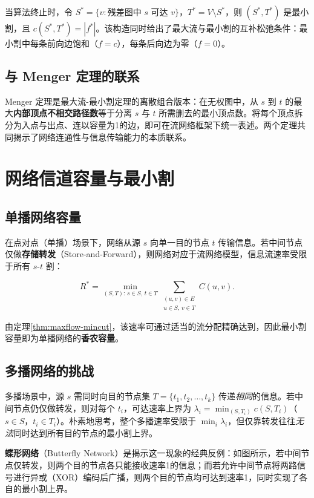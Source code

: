 \documentclass[12pt, a4paper]{article}
\begin{document}
当算法终止时，令 $S^* = \{v : \text{残差图中 }s\text{ 可达 }v\}$，$T^* = V\setminus S^*$，则 $(S^*,T^*)$ 是最小割，且 $c(S^*,T^*) = |f^*|$\cite{ford1956maximal}。该构造同时给出了最大流与最小割的互补松弛条件：最小割中每条前向边饱和（$f=c$），每条后向边为零（$f=0$）。

\subsection{与 Menger 定理的联系}

Menger 定理\cite{menger1927}是最大流-最小割定理的离散组合版本：在无权图中，从 $s$ 到 $t$ 的最大\textbf{内部顶点不相交路径数}等于分离 $s$ 与 $t$ 所需删去的最小顶点数。将每个顶点拆分为入点与出点、连以容量为1的边，即可在流网络框架下统一表述。两个定理共同揭示了网络连通性与信息传输能力的本质联系。

\section{网络信道容量与最小割}

\subsection{单播网络容量}

在点对点（单播）场景下，网络从源 $s$ 向单一目的节点 $t$ 传输信息。若中间节点仅做\textbf{存储转发}（Store-and-Forward），则网络对应于流网络模型，信息流速率受限于所有 $s$-$t$ 割：

\[
  R^* = \min_{(S,T):\, s\in S,\, t\in T} \sum_{\substack{(u,v)\in E \\ u\in S,\,v\in T}} C(u,v).
\]

由定理\ref{thm:maxflow-mincut}，该速率可通过适当的流分配精确达到，因此最小割容量即为单播网络的\textbf{香农容量}。

\subsection{多播网络的挑战}

多播场景中，源 $s$ 需同时向目的节点集 $T = \{t_1, t_2, \ldots, t_k\}$ 传递\emph{相同}的信息。若中间节点仍仅做转发，则对每个 $t_i$，可达速率上界为 $\lambda_i = \min_{(S,T_i)} c(S,T_i)$（$s\in S$，$t_i\in T_i$）。朴素地思考，整个多播速率受限于 $\min_i \lambda_i$，但仅靠转发往往\emph{无法}同时达到所有目的节点的最小割上界。

\textbf{蝶形网络}（Butterfly Network）是揭示这一现象的经典反例\cite{ahlswede2000network}：如图所示，若中间节点仅转发，则两个目的节点各只能接收速率1的信息；而若允许中间节点将两路信号进行异或（XOR）编码后广播，则两个目的节点均可达到速率1，同时实现了各自的最小割上界。
\end{document}
